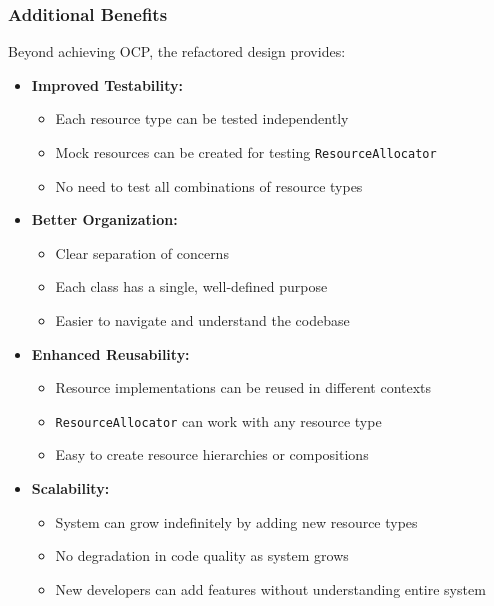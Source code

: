 \subsubsection{Additional Benefits}

Beyond achieving OCP, the refactored design provides:

\begin{itemize}
    \item \textbf{Improved Testability:}
    \begin{itemize}
        \item Each resource type can be tested independently
        \item Mock resources can be created for testing \texttt{ResourceAllocator}
        \item No need to test all combinations of resource types
    \end{itemize}
    
    \item \textbf{Better Organization:}
    \begin{itemize}
        \item Clear separation of concerns
        \item Each class has a single, well-defined purpose
        \item Easier to navigate and understand the codebase
    \end{itemize}
    
    \item \textbf{Enhanced Reusability:}
    \begin{itemize}
        \item Resource implementations can be reused in different contexts
        \item \texttt{ResourceAllocator} can work with any resource type
        \item Easy to create resource hierarchies or compositions
    \end{itemize}
    
    \item \textbf{Scalability:}
    \begin{itemize}
        \item System can grow indefinitely by adding new resource types
        \item No degradation in code quality as system grows
        \item New developers can add features without understanding entire system
    \end{itemize}
\end{itemize}

